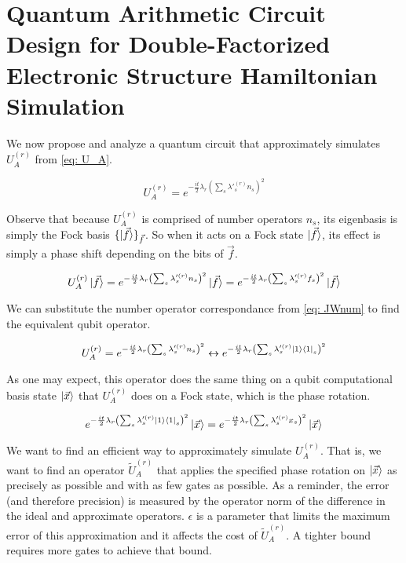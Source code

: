 

\chapter{Quantum Arithmetic Circuit Design for Double-Factorized Electronic Structure Hamiltonian Simulation}

We now propose and analyze a quantum circuit that approximately simulates $U_A^{(r)}$ from \eqref{eq: U_A}.

\begin{equation}
    U_A^{(r)} = e^{-\frac{it}{2}\lambda_r\left(\sum_s \lambda'^{(r)}_s n_s\right)^2}
\end{equation}

Observe that because $U_A^{(r)}$ is comprised of number operators $n_s$, its eigenbasis is simply the Fock basis $\{\ket{\vec{f}}\}_{\vec{f}}$. So when it acts on a Fock state $\ket{\vec{f}}$, its effect is simply a phase shift depending on the bits of $\vec{f}$.

\begin{equation}
    U_A^{(r)}\ket{\vec{f}} = e^{-\frac{it}{2}\lambda_r\left(\sum_s \lambda'^{(r)}_s n_s\right)^2}\ket{\vec{f}} = e^{-\frac{it}{2}\lambda_r\left(\sum_s \lambda'^{(r)}_s f_s\right)^2}\ket{\vec{f}}
\end{equation}

We can substitute the number operator correspondance from \eqref{eq: JWnum} to find the equivalent qubit operator.

\begin{equation}
    U_A^{(r)} = e^{-\frac{it}{2}\lambda_r\left(\sum_s \lambda'^{(r)}_s n_s\right)^2} \leftrightarrow e^{-\frac{it}{2}\lambda_r\left(\sum_s \lambda'^{(r)}_s \ket{1}\bra{1}_s\right)^2}
\end{equation}

As one may expect, this operator does the same thing on a qubit computational basis state $\ket{\vec{x}}$ that $U_A^{(r)}$ does on a Fock state, which is the phase rotation.

\begin{equation}
    e^{-\frac{it}{2}\lambda_r\left(\sum_s \lambda'^{(r)}_s \ket{1}\bra{1}_s\right)^2}\ket{\vec{x}} = e^{-\frac{it}{2}\lambda_r\left(\sum_s \lambda'^{(r)}_s x_s\right)^2}\ket{\vec{x}}
\end{equation}

We want to find an efficient way to approximately simulate $U_A^{(r)}$. That is, we want to find an operator $\tilde{U}_A^{(r)}$ that applies the specified phase rotation on $\ket{\vec{x}}$ as precisely as possible and with as few gates as possible. As a reminder, the error (and therefore precision) is measured by the operator norm of the difference in the ideal and approximate operators. $\epsilon$ is a parameter that limits the maximum error of this approximation and it affects the cost of $\tilde{U}_A^{(r)}$. A tighter bound requires more gates to achieve that bound.

